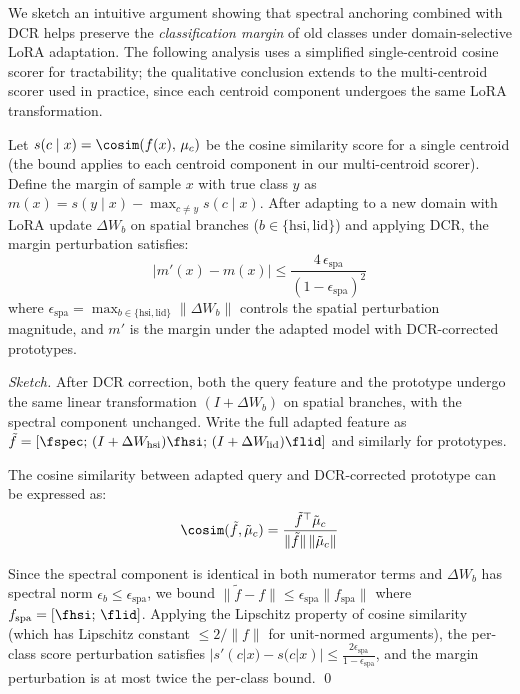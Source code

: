 We sketch an intuitive argument showing that spectral anchoring combined with DCR helps preserve the \emph{classification margin} of old classes under domain-selective LoRA adaptation. The following analysis uses a simplified single-centroid cosine scorer for tractability; the qualitative conclusion extends to the multi-centroid scorer used in practice, since each centroid component undergoes the same LoRA transformation.

\begin{remark}
\label{remark:margin}
Let $s(c \mid x) = \cosim(f(x),\, \mu_c)$ be the cosine similarity score for a single centroid (the bound applies to each centroid component in our multi-centroid scorer).
Define the margin of sample $x$ with true class $y$ as $m(x) = s(y \mid x) - \max_{c \neq y} s(c \mid x)$.
After adapting to a new domain with LoRA update $\Delta W_b$ on spatial branches ($b \in \{\mathrm{hsi, lid}\}$) and applying DCR, the margin perturbation satisfies:
\begin{equation}
    |m'(x) - m(x)| \leq \frac{4\,\epsilon_{\mathrm{spa}}}{(1 - \epsilon_{\mathrm{spa}})^2}
\label{eq:margin_bound}
\end{equation}
where $\epsilon_{\mathrm{spa}} = \max_{b \in \{\mathrm{hsi,lid}\}} \|\Delta W_b\|$ controls the spatial perturbation magnitude, and $m'$ is the margin under the adapted model with DCR-corrected prototypes.
\end{remark}

\begin{proof}[Sketch]
After DCR correction, both the query feature and the prototype undergo the same linear transformation $(I + \Delta W_b)$ on spatial branches, with the spectral component unchanged.
Write the full adapted feature as $\tilde{f} = [\fspec;\, (I+\Delta W_{\mathrm{hsi}})\fhsi;\, (I+\Delta W_{\mathrm{lid}})\flid]$ and similarly for prototypes.

The cosine similarity between adapted query and DCR-corrected prototype can be expressed as:
\begin{equation}
    \cosim(\tilde{f}, \tilde{\mu}_c) = \frac{\tilde{f}^\top \tilde{\mu}_c}{\|\tilde{f}\|\,\|\tilde{\mu}_c\|}
\end{equation}

Since the spectral component is identical in both numerator terms and $\Delta W_b$ has spectral norm $\epsilon_b \leq \epsilon_{\mathrm{spa}}$, we bound $\|\tilde{f} - f\| \leq \epsilon_{\mathrm{spa}} \|f_{\mathrm{spa}}\|$ where $f_{\mathrm{spa}} = [\fhsi;\,\flid]$.
Applying the Lipschitz property of cosine similarity (which has Lipschitz constant $\leq 2/\|f\|$ for unit-normed arguments), the per-class score perturbation satisfies $|s'(c|x) - s(c|x)| \leq \frac{2\epsilon_{\mathrm{spa}}}{1-\epsilon_{\mathrm{spa}}}$, and the margin perturbation is at most twice the per-class bound. \qed
\end{proof}

